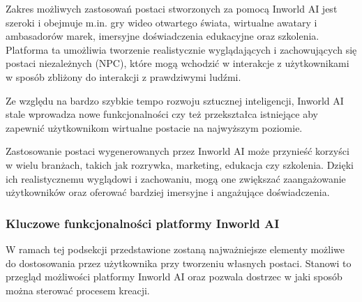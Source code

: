 Zakres możliwych zastosowań postaci stworzonych za pomocą Inworld AI jest szeroki i obejmuje m.in. gry
wideo otwartego świata, wirtualne awatary i ambasadorów marek, imersyjne doświadczenia edukacyjne oraz
szkolenia. Platforma ta umożliwia tworzenie realistycznie wyglądających i zachowujących się postaci
niezależnych (NPC), które mogą wchodzić w interakcje z użytkownikami w sposób zbliżony do interakcji z
prawdziwymi ludźmi.

Ze względu na bardzo szybkie tempo rozwoju sztucznej inteligencji, Inworld AI stale wprowadza nowe 
funkcjonalności czy też przekształca istniejące aby zapewnić użytkownikom wirtualne postacie na
najwyższym poziomie.

Zastosowanie postaci wygenerowanych przez Inworld AI może przynieść korzyści w wielu branżach, takich
jak rozrywka, marketing, edukacja czy szkolenia. Dzięki ich realistycznemu wyglądowi i zachowaniu, mogą
one zwiększać zaangażowanie użytkowników oraz oferować bardziej imersyjne i angażujące doświadczenia.

\subsubsection*{Kluczowe funkcjonalności platformy Inworld AI}

W ramach tej podsekcji przedstawione zostaną najważniejsze elementy możliwe do dostosowania przez
użytkownika przy tworzeniu własnych postaci. Stanowi to przegląd możliwości platformy Inworld AI
oraz pozwala dostrzec w jaki sposób można sterować procesem kreacji.

